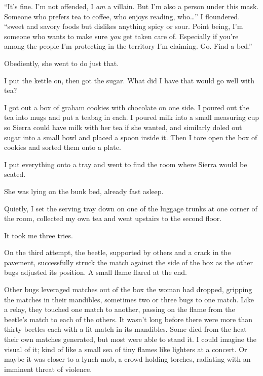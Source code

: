 ``It's fine.  I'm not offended, I \emph{am} a villain.  But I'm also a person under this mask.  Someone who prefers tea to coffee, who enjoys reading, who\ldots''  I floundered.  ``\ldotslikes sweet and savory foods but dislikes anything spicy or sour.  Point being, I'm someone who wants to make sure \emph{you} get taken care of.  Especially if you're among the people I'm protecting in the territory I'm claiming.  Go.  Find a bed.''



Obediently, she went to do just that.



I put the kettle on, then got the sugar.  What did I have that would go well with tea?



I got out a box of graham cookies with chocolate on one side.  I poured out the tea into mugs and put a teabag in each.  I poured milk into a small measuring cup so Sierra could have milk with her tea if she wanted, and similarly doled out sugar into a small bowl and placed a spoon inside it.  Then I tore open the box of cookies and sorted them onto a plate.



I put everything onto a tray and went to find the room where Sierra would be seated.



She was lying on the bunk bed, already fast asleep.



Quietly, I set the serving tray down on one of the luggage trunks at one corner of the room, collected my own tea and went upstairs to the second floor.



\blacksquare



It took me three tries.



On the third attempt, the beetle, supported by others and a crack in the pavement, successfully struck the match against the side of the box as the other bugs adjusted its position.  A small flame flared at the end.



Other bugs leveraged matches out of the box the woman had dropped, gripping the matches in their mandibles, sometimes two or three bugs to one match.  Like a relay, they touched one match to another, passing on the flame from the beetle's match to each of the others.  It wasn't long before there were more than thirty beetles each with a lit match in its mandibles.  Some died from the heat their own matches generated, but most were able to stand it.  I could imagine the visual of it; kind of like a small sea of tiny flames like lighters at a concert.  Or maybe it was closer to a lynch mob, a crowd holding torches, radiating with an imminent threat of violence.



